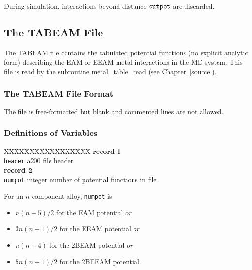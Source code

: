 During simulation, interactions beyond distance ${\tt cutpot}$ are discarded.

\subsection{The TABEAM File}
\label{tabeam-file}

The TABEAM file contains the tabulated potential functions (no explicit
analytic form) describing the EAM or EEAM
metal interactions in the MD system.  This file is read by the subroutine
{\sc metal\_table\_read} (see Chapter~\ref{source}).

\subsubsection{The TABEAM File Format}

The file is free-formatted but blank and commented lines are not
allowed.

\subsubsection{Definitions of Variables}

\begin{tabbing}
X\=XXXXXXXX\=XXXXXXXX\=\kill
{\bf record 1} \\
\> {\tt header} \> a200    \> file header \\
{\bf record 2} \\
\> {\tt numpot} \> integer \> number of potential functions in file
\end{tabbing}

For an $n$ component alloy, {\tt numpot} is
\begin{itemize}
\item $n(n+5)/2$ for the EAM potential $or$
\item $3n(n+1)/2$ for the EEAM potential $or$
\item $n(n+4)$ for the 2BEAM potential $or$
\item $5n(n+1)/2$ for the 2BEEAM potential.
\end{itemize}

